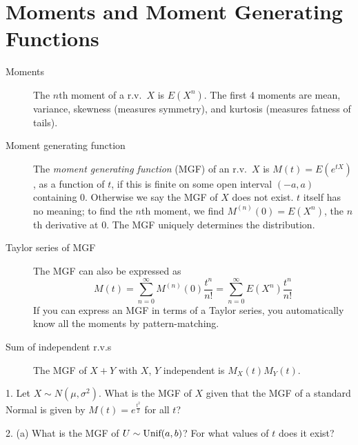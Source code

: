 \documentclass{article}
\begin{document}
 

\header

\section{Moments and Moment Generating Functions}

\begin{description}
\item[Moments] The $n$th moment of a r.v.~$X$ is $E(X^n)$. The first 4 moments are mean, variance, skewness (measures symmetry), and kurtosis (measures fatness of tails).

\item[Moment generating function] The \textit{moment generating function} (MGF) of an r.v.~$X$ is $M(t) = E(e^{tX})$, as a function of $t$, if this is finite on some open interval $(-a, a)$ containing 0. Otherwise we say the MGF of $X$ does not exist. $t$ itself has no meaning; to find the $n$th moment, we find $M^{(n)}(0) = E(X^n)$, the $n$th derivative at 0. The MGF uniquely determines the distribution. 

\item[Taylor series of MGF] The MGF can also be expressed as $$M(t) = \sum_{n = 0}^\infty M^{(n)}(0)\frac{t^n}{n!} = \sum_{n = 0}^\infty E(X^n)\frac{t^n}{n!}$$ If you can express an MGF in terms of a Taylor series, you automatically know all the moments by pattern-matching.

\item[Sum of independent r.v.s] The MGF of $X + Y$ with $X$, $Y$ independent is $M_X(t)M_Y(t)$.
\end{description}

1. Let $X \sim N(\mu,\sigma^2)$. What is the MGF of $X$ given that the MGF of a standard Normal is given by $M(t) = e^{\frac{t^2}{2}}$ for all $t$? 


2. (a) What is the MGF of $U \sim \textrm{Unif}(a,b)$? For what values of $t$ does it exist?  

\end{document}
